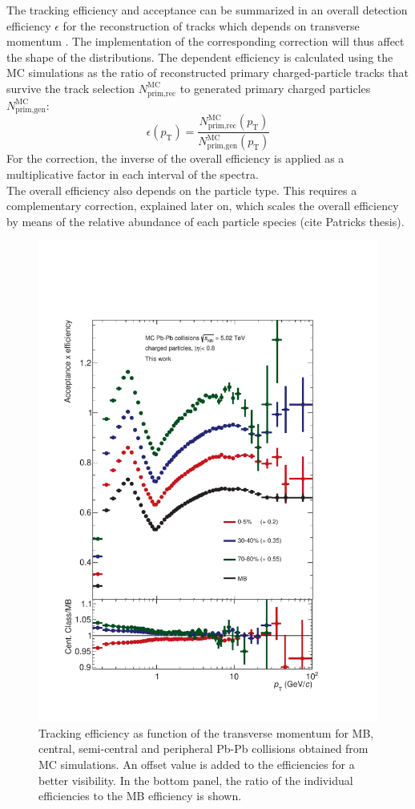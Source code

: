 \documentclass[12pt,a4paper]{report}
\begin{document}
The tracking efficiency and acceptance can be summarized in an overall detection efficiency $\epsilon$ for the reconstruction of tracks which depends on transverse momentum \pt. The implementation of the corresponding correction will thus affect the shape of the \pt distributions. The \pt dependent efficiency is calculated using the MC simulations as the ratio of reconstructed primary charged-particle tracks that survive the track selection $N_\text{prim,rec}^\text{MC}$ to generated primary charged particles $N_\text{prim,gen}^\text{MC}$: 
\begin{equation}
\epsilon(p_\text{T}) = \dfrac{N_\text{prim,rec}^\text{MC}(p_\text{T})}{N_\text{prim,gen}^\text{MC}(p_\text{T})} 
\label{trckEffEq}
\end{equation}
For the correction, the inverse of the overall efficiency is applied as a multiplicative factor in each \pt interval of the \pt spectra.\\
The overall efficiency also depends on the particle type. This requires a complementary correction, explained later on, which scales the overall efficiency by means of the relative abundance of each particle species (cite Patricks thesis).\\
\begin{figure}[tb!]
\centering
\includegraphics[width=12cm]{Plots/trckEffPbPb1.pdf}  
\caption{Tracking efficiency as function of the transverse momentum for MB, central, semi-central and peripheral Pb-Pb collisions obtained from MC simulations. An offset value is added to the efficiencies for a better visibility. In the bottom panel, the ratio of the individual efficiencies to the MB efficiency is shown.}
\label{trckEffPbPb1}
\end{figure}
\end{document}
